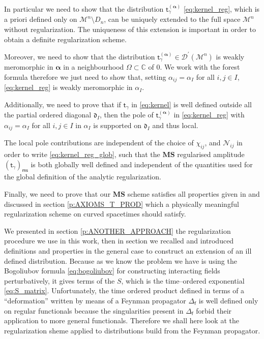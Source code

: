 \documentclass[11pt]{book}
\newcommand{\ms}{\mathsf{ms}}
\newcommand{\MS}{\textbf{MS}}
\newcommand{\alphabd}{\boldsymbol{\alpha}}
\newcommand{\Dcal}{\mathcal{D}}
\newcommand{\Mcal}{\mathcal{M}}
\newcommand{\Ncal}{\mathcal{N}}
\newcommand{\Cbb}{\mathbb{C}}
\newcommand{\drak}{\mathfrak{d}}
\newcommand{\fsf}{\mathsf{f}}
\newcommand{\tsf}{\mathsf{t}}
\theoremstyle{break}
\begin{document}
In particular we need to show that the distribution $\tsf^{(\alphabd)}_\gamma$ \eqref{eq:kernel_reg}, which is a priori defined only on $\Mcal^n \setminus D_n$, can be uniquely extended to the full space $\Mcal^n$ without regularization. The uniqueness of this extension is important in order to obtain a definite regularization scheme. 


Moreover, we need to show that the distribution $\tsf^{(\alphabd)}_\gamma \in \Dcal^\prime(\Mcal^n)$ is weakly meromorphic in $\alphabd$ in a neighbourhood $\Omega \subset \Cbb$ of 0. We work with the forest formula therefore we just need to show that, setting $\alpha_{ij} = \alpha_I$ for all $i,j\in I$, \eqref{eq:kernel_reg} is weakly meromorphic in $\alpha_I$. 


Additionally, we need to prove that if $\tsf_\gamma$ in \eqref{eq:kernel} is well defined outside all the partial ordered diagonal $\drak_I$, then the pole of $\tsf^{(\alphabd)}_\gamma$ in \eqref{eq:kernel_reg} with $\alpha_{ij} = \alpha_I$ for all $i,j\in I$ in $\alpha_I$ is supported on $\drak_I$ and thus local. 


The local pole contributions are independent of the choice of $\chi_{ij}$, and $\Ncal_{ij}$ in order to write \eqref{eq:kernel_reg_glob}, such that the $\MS$ regularised amplitude $(\tsf_\gamma)_\ms$ is both globally well defined and independent of the quantities used for the global definition of the analytic regularization. 


Finally, we need to prove that our $\MS$ scheme satisfies all properties given in \cite{hollands_local_2001,hollands_existence_2002} and discussed in section \ref{p:AXIOMS_T_PROD} which a physically meaningful regularization scheme on curved spacetimes should satisfy.


We presented in section \ref{p:ANOTHER_APPROACH} the regularization procedure we use in this work, then in section %
we recalled and introduced definitions and properties in the general case to construct an extension of an ill defined distribution. Because as we know the problem we have is using the Bogoliubov formula \eqref{eq:bogoliubov} for constructing interacting fields perturbatively, it gives terms of the $S$, which is the time--ordered exponential \eqref{eq:S_matrix}. Unfortunately, the time ordered product defined in terms of a ``deformation'' written by means of a Feynman propagator $\Delta_\fsf$ is well defined only on regular functionals because the singularities present in $\Delta_\fsf$ forbid their application to more general functionals. Therefore we shall here look at the regularization sheme applied to distributions build from the Feynman propagator.
\end{document}
